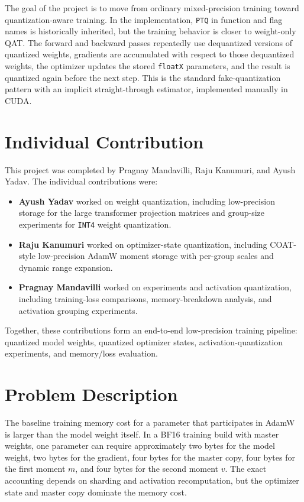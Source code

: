 \documentclass{article}
\begin{document}
The goal of the project is to move from ordinary mixed-precision training toward
quantization-aware training. In the implementation, \texttt{PTQ} in function and flag names
is historically inherited, but the training behavior is closer to weight-only QAT. The
forward and backward passes repeatedly use dequantized versions of quantized weights,
gradients are accumulated with respect to those dequantized weights, the optimizer updates
the stored \texttt{floatX} parameters, and the result is quantized again before the next
step. This is the standard fake-quantization pattern with an implicit straight-through
estimator, implemented manually in CUDA.

\section{Individual Contribution}

This project was completed by Pragnay Mandavilli, Raju Kanumuri, and Ayush Yadav. The
individual contributions were:

\begin{itemize}
  \item \textbf{Ayush Yadav} worked on weight quantization, including low-precision storage
  for the large transformer projection matrices and group-size experiments for
  \texttt{INT4} weight quantization.
  \item \textbf{Raju Kanumuri} worked on optimizer-state quantization, including COAT-style
  low-precision AdamW moment storage with per-group scales and dynamic range expansion.
  \item \textbf{Pragnay Mandavilli} worked on experiments and activation quantization,
  including training-loss comparisons, memory-breakdown analysis, and activation grouping
  experiments.
\end{itemize}

Together, these contributions form an end-to-end low-precision training pipeline:
quantized model weights, quantized optimizer states, activation-quantization experiments,
and memory/loss evaluation.

\section{Problem Description}

The baseline training memory cost for a parameter that participates in AdamW is larger than
the model weight itself. In a BF16 training build with master weights, one parameter can
require approximately two bytes for the model weight, two bytes for the gradient, four bytes
for the master copy, four bytes for the first moment $m$, and four bytes for the second
moment $v$. The exact accounting depends on sharding and activation recomputation, but the
optimizer state and master copy dominate the memory cost.
\end{document}

